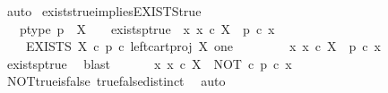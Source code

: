 \begin{isabellebody}
\ auto%
\endisatagproof
{\isafoldproof}%
%
\isadelimproof
\isanewline
%
\endisadelimproof
\isanewline
{}\isamarkupfalse%
\ exists{\isacharunderscore}{\kern0pt}true{\isacharunderscore}{\kern0pt}implies{\isacharunderscore}{\kern0pt}EXISTS{\isacharunderscore}{\kern0pt}true{\isacharcolon}{\kern0pt}\isanewline
\ \ \ p{\isacharunderscore}{\kern0pt}type{\isacharcolon}{\kern0pt}\ {\isachardoublequoteopen}p\ {\isacharcolon}{\kern0pt}\ X\ {\isasymrightarrow}\ {\isasymOmega}{\isachardoublequoteclose}\ \ exists{\isacharunderscore}{\kern0pt}p{\isacharunderscore}{\kern0pt}true{\isacharcolon}{\kern0pt}\ {\isachardoublequoteopen}{\isasymexists}\ x{\isachardot}{\kern0pt}\ x\ {\isasymin}\isactrlsub c\ X\ {\isasymand}\ p\ {\isasymcirc}\isactrlsub c\ x\ {\isacharequal}{\kern0pt}\ {\isasymt}{\isachardoublequoteclose}\isanewline
\ \ \ \ {\isachardoublequoteopen}EXISTS\ X\ {\isasymcirc}\isactrlsub c\ {\isacharparenleft}{\kern0pt}p\ {\isasymcirc}\isactrlsub c\ left{\isacharunderscore}{\kern0pt}cart{\isacharunderscore}{\kern0pt}proj\ X\ one{\isacharparenright}{\kern0pt}\isactrlsup {\isasymsharp}\ {\isacharequal}{\kern0pt}\ {\isasymt}{\isachardoublequoteclose}\isanewline
%
\isadelimproof
%
\endisadelimproof
%
\isatagproof
{}\isamarkupfalse%
\ {\isacharminus}{\kern0pt}\isanewline
\ \isamarkupfalse%
\ {\isachardoublequoteopen}{\isasymnot}\ {\isacharparenleft}{\kern0pt}{\isasymforall}\ x{\isachardot}{\kern0pt}\ x\ {\isasymin}\isactrlsub c\ X\ {\isasymlongrightarrow}\ p\ {\isasymcirc}\isactrlsub c\ x\ {\isasymnoteq}\ {\isasymt}{\isacharparenright}{\kern0pt}{\isachardoublequoteclose}\isanewline
\ \ \ \isamarkupfalse%
\ exists{\isacharunderscore}{\kern0pt}p{\isacharunderscore}{\kern0pt}true\ \isamarkupfalse%
\ blast\isanewline
\ \isamarkupfalse%
\ \isamarkupfalse%
\ {\isachardoublequoteopen}{\isasymnot}\ {\isacharparenleft}{\kern0pt}{\isasymforall}\ x{\isachardot}{\kern0pt}\ x\ {\isasymin}\isactrlsub c\ X\ {\isasymlongrightarrow}\ NOT\ {\isasymcirc}\isactrlsub c\ {\isacharparenleft}{\kern0pt}p\ {\isasymcirc}\isactrlsub c\ x{\isacharparenright}{\kern0pt}\ {\isacharequal}{\kern0pt}\ {\isasymt}{\isacharparenright}{\kern0pt}{\isachardoublequoteclose}\isanewline
\ \ \ \isamarkupfalse%
\ NOT{\isacharunderscore}{\kern0pt}true{\isacharunderscore}{\kern0pt}is{\isacharunderscore}{\kern0pt}false\ true{\isacharunderscore}{\kern0pt}false{\isacharunderscore}{\kern0pt}distinct\ \isamarkupfalse%
\ auto\isanewline

\end{isabellebody}
